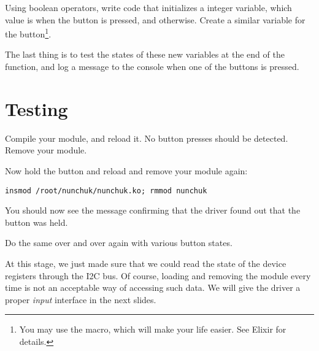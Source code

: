 Using boolean operators, write code that initializes a 
integer variable, which value is  when the  button is
pressed, and  otherwise. Create a similar 
variable for the  button\footnote{You may use the 
macro, which will make your life easier. See Elixir for details.}.

The last thing is to test the states of these new variables at the end
of the  function, and log a message to the console
when one of the buttons is pressed.

\section{Testing}

Compile your module, and reload it. No button presses should be
detected. Remove your module.

Now hold the  button and reload and remove your module again:
\begin{verbatim}
insmod /root/nunchuk/nunchuk.ko; rmmod nunchuk
\end{verbatim}

You should now see the message confirming that the driver found
out that the  button was held.

Do the same over and over again with various button states.

At this stage, we just made sure that we could read the state
of the device registers through the I2C bus. Of course, loading and
removing the module every time is not an acceptable way of
accessing such data. We will give the driver a proper {\em input}
interface in the next slides.
